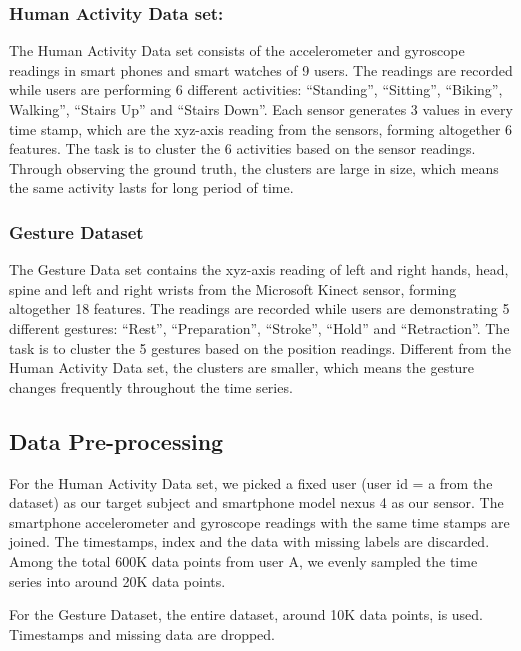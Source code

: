 \documentclass{llncs}
\begin{document}
\subsubsection{Human Activity Data set:}
The Human Activity Data set consists of the accelerometer and gyroscope readings in smart phones and smart watches of 9 users. The readings are recorded while users are performing 6 different activities: “Standing”, “Sitting”, “Biking”, Walking”, “Stairs Up” and “Stairs Down”. Each sensor generates 3 values in every time stamp, which are the xyz-axis reading from the sensors, forming altogether 6 features. The task is to cluster the 6 activities based on the sensor readings. Through observing the ground truth, the clusters are large in size, which means the same activity lasts for long period of time.

\subsubsection{Gesture Dataset}
The Gesture Data set contains the xyz-axis reading of left and right hands, head, spine and left and right wrists from the Microsoft Kinect sensor, forming altogether 18 features. The readings are recorded while users are demonstrating 5 different gestures: “Rest”, “Preparation”, “Stroke”, “Hold” and “Retraction”. The task is to cluster the 5 gestures based on the position readings. Different from the Human Activity Data set, the clusters are smaller, which means the gesture changes frequently throughout the time series.

\subsection{Data Pre-processing}
For the Human Activity Data set, we picked a fixed user (user id = a from the dataset) as our target subject and smartphone model nexus 4 as our sensor. The smartphone accelerometer and gyroscope readings with the same time stamps are joined. The timestamps, index and the data with missing labels are discarded. Among the total 600K data points from user A, we evenly sampled the time series into around 20K data points.  

For the Gesture Dataset, the entire dataset, around 10K data points, is used. Timestamps and missing data are dropped. 
\end{document}
